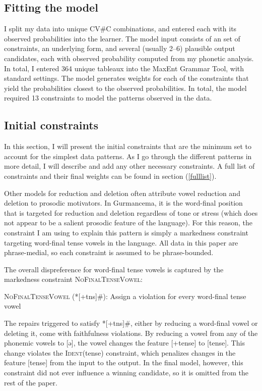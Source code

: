 \documentclass[output=paper,newtxmath,modfonts,nonflat,draftmode]{langsci/langscibook}
\begin{document}
\subsection{Fitting the model}

I split my data into unique CV\#C combinations, and entered each with its observed probabilities into the learner. The model input consists of an set of constraints, an underlying form, and several (usually 2--6) plausible output candidates, each with observed probability computed from my phonetic analysis. In total, I entered 364 unique tableaux into the MaxEnt Grammar Tool, with standard settings. The model generates weights for each of the constraints that yield the probabilities closest to the observed probabilities. In total, the model required 13 constraints to model the patterns observed in the data. 

\subsection{Initial constraints}
In this section, I will present the initial constraints that are the minimum set to account for the simplest data patterns. As I go through the different patterns in more detail, I will describe and add any other necessary constraints. A full list of constraints and their final weights can be found in section (\ref{fulllist}). 

Other models for reduction and deletion often attribute vowel reduction and deletion to prosodic motivators. In Gurmancema, it is the word-final position that is targeted for reduction and deletion regardless of tone or stress (which does not appear to be a salient prosodic feature of the language). For this reason, the constraint I am using to explain this pattern is simply a markedness constraint targeting word-final tense vowels in the language. All data in this paper are phrase-medial, so each constraint is assumed to be phrase-bounded. 

The overall dispreference for word-final tense vowels is captured by the 
markedness constraint \textsc{NoFinalTenseVowel}:

\ea
\textsc{NoFinalTenseVowel} (*[+tns]\#): Assign a violation for every word-final tense vowel
\z

The repairs triggered to satisfy *[+tns]\#, either by reducing a word-final vowel or deleting it, come with faithfulness violations. By reducing a vowel from any of the phonemic vowels to [ə], the vowel changes the feature [+tense] to [\textminus tense]. This change violates the \textsc{Ident}(tense) constraint, which penalizes changes in the feature [tense] from the input to the output. In the final model, however, this constraint did not ever influence a winning candidate, so it is omitted from the rest of the paper.
\end{document}

